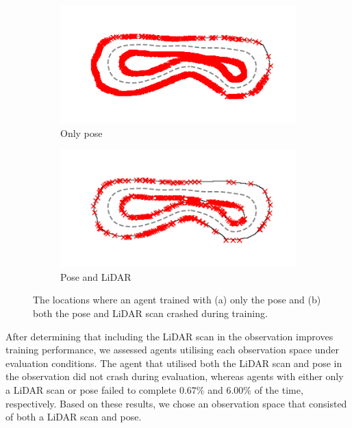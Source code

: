\begin{figure}[htb!]
    \centering
    \begin{subfigure}[htb!]{0.45\textwidth}
        \centering
        \includegraphics[height=.56\linewidth]{contents/chapt5/figs/observation/collision_distributions/crash_location_pose.png}
        \caption{Only pose}
    \end{subfigure}
    \hfill
    \begin{subfigure}[htb!]{0.45\textwidth}
        \centering
        \includegraphics[height=.56\linewidth]{contents/chapt5/figs/observation/collision_distributions/crash_location_both.png}
        \caption{Pose and LiDAR}
    \end{subfigure}
    \hfill
\caption[Locations of crashes during training]{The locations where an agent trained with (a) only the pose and (b) both the pose and LiDAR scan crashed during training.}
\label{fig:collision_distribution}
\end{figure}

After determining that including the LiDAR scan in the observation improves training performance, we assessed agents utilising each observation space under evaluation conditions.
The agent that utilised both the LiDAR scan and pose in the observation did not crash during evaluation, whereas agents with either only a LiDAR scan or pose failed to complete $0.67\%$ and $6.00\%$ of the time, respectively.
Based on these results, we chose an observation space that consisted of both a LiDAR scan and pose.


